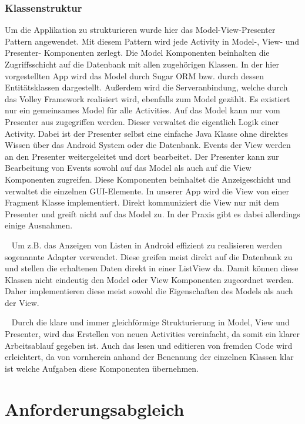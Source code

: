 \documentclass{scrartcl}
\begin{document}
\subsubsection{Klassenstruktur}

\noindent
Um die Applikation zu strukturieren wurde hier das Model-View-Presenter Pattern
angewendet. Mit diesem Pattern wird jede Activity in Model-, View- und
Presenter- Komponenten zerlegt. Die Model Komponenten beinhalten die
Zugriffsschicht auf die Datenbank mit allen zugehörigen Klassen. In der hier
vorgestellten App wird das Model durch Sugar ORM bzw. durch dessen
Entitätsklassen dargestellt. Außerdem wird die Serveranbindung, welche durch das
Volley Framework realisiert wird, ebenfalls zum Model gezählt. Es existiert
nur ein gemeinsames Model für alle Activities. Auf das Model kann nur vom
Presenter aus zugegriffen werden. Dieser verwaltet die
eigentlich Logik einer Activity. Dabei ist der Presenter selbst eine einfache
Java Klasse ohne direktes Wissen über das Android System oder die Datenbank.
Events der View werden an den Presenter weitergeleitet und dort bearbeitet. Der
Presenter kann zur Bearbeitung von Events sowohl auf das Model als auch auf die
View Komponenten zugreifen. Diese Komponenten beinhaltet die Anzeigeschicht und
verwaltet die einzelnen GUI-Elemente. In unserer App wird die View von einer
Fragment Klasse implementiert. Direkt kommuniziert die View nur mit dem
Presenter und greift nicht auf das Model zu. In der Praxis gibt es dabei
allerdings einige Ausnahmen.

\ \newline
Um z.B. das Anzeigen von Listen in Android effizient zu realisieren werden
sogenannte Adapter verwendet. Diese greifen meist direkt auf die Datenbank zu
und stellen die erhaltenen Daten direkt in einer ListView da. Damit können diese
Klassen nicht eindeutig den Model oder View Komponenten zugeordnet werden. Daher
implementieren diese meist sowohl die Eigenschaften des Models als auch der
View.

\ \newline
Durch die klare und immer gleichförmige Strukturierung in Model, View und
Presenter, wird das Erstellen von neuen Activities vereinfacht, da somit ein
klarer Arbeitsablauf gegeben ist. Auch das lesen und editieren von fremden Code
wird erleichtert, da von vornherein anhand der Benennung der einzelnen Klassen
klar ist welche Aufgaben diese Komponenten übernehmen.

\section{Anforderungsabgleich}
\end{document}
